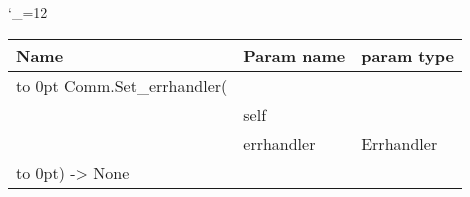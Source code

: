 \begingroup \catcode`\_=12 \tt
\begin{tabular}{lll}
\toprule
\textrm{Name}&\textrm{Param name}&\textrm{param type}\\
\midrule
\hbox to 0pt {Comm.Set_errhandler(\hss}\\
& self\\
& errhandler & Errhandler\\
\hbox to 0pt{) -> None\hss}\\
\bottomrule
\end{tabular}
\endgroup
